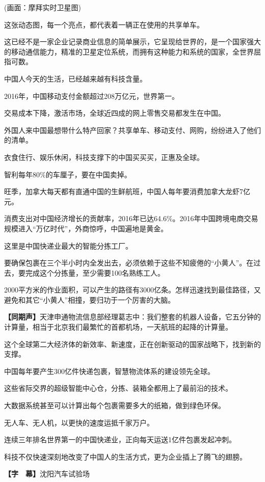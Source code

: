 \documentclass{ctexart}
\newcommand{\zkh}[1]{\textbf{\hspace{-2.7em} 【#1】}}
\begin{document}
 (画面：摩拜实时卫星图)

 这张动态图，每一个亮点，都代表着一辆正在使用的共享单车。

这已经不是一家企业记录商业信息的简单展示，它呈现给世界的，是一个国家强大的移动通信能力，精准的卫星定位系统，而拥有这种能力和系统的国家，全世界屈指可数。

 中国人今天的生活，已经越来越有科技含量。

 2016年，中国移动支付金额超过208万亿元，世界第一。

 交易成本下降，激活市场，全球近四成的网上零售交易都发生在中国。

外国人来中国最想带什么特产回家？共享单车、移动支付、网购，纷纷进入了他们的清单。

 衣食住行、娱乐休闲，科技支撑下的中国买买买，正惠及全球。

 智利每年80{\%}的车厘子，要在中国卖掉。

 旺季，加拿大每天都有直通中国的生鲜航班，中国人每年要消费加拿大龙虾7亿元。

消费支出对中国经济增长的贡献率，2016年已达64.6{\%}。2016年中国跨境电商交易规模进入``万亿时代''，外商惊呼，中国遍地是黄金。

 这里是中国快递业最大的智能分拣工厂。

要确保包裹在三个半小时内全发出去，必须依赖于这些不知疲倦的``小黄人''。在过去，要完成这个分拣量，至少需要100名熟练工人。

2000平方米的作业面积，可以产生的路径有3000亿条。怎样迅速找到最佳路径，又避免和其它``小黄人''相撞，要归功于一个厉害的大脑。

 \zkh{同期声}天津申通物流信息部经理葛志中：我们整套的机器人设备，它五分钟的计算量，相当于北京我们最繁忙的首都机场，一天航班的起降的计算量。

 
这个全球第二大经济体的新效率、新速度，正在创新驱动的国家战略下，找到新的支撑。

 中国每年要产生300亿件快递包裹，智慧物流体系的建设领先全球。

 这些省际交界的超级智能中心仓，分拣、装箱全都用上了最前沿的技术。

 大数据系统甚至可以计算出每个包裹需要多大的纸箱，做到绿色环保。

 无人车、无人机，以更快的速度运抵千家万户。

 连续三年排名世界第一的中国快递业，正向每天运送1亿件包裹发起冲刺。

 科技不仅快速深刻地改变了中国人的生活方式，更为企业插上了腾飞的翅膀。

 \zkh{字　幕}沈阳汽车试验场
\end{document}
